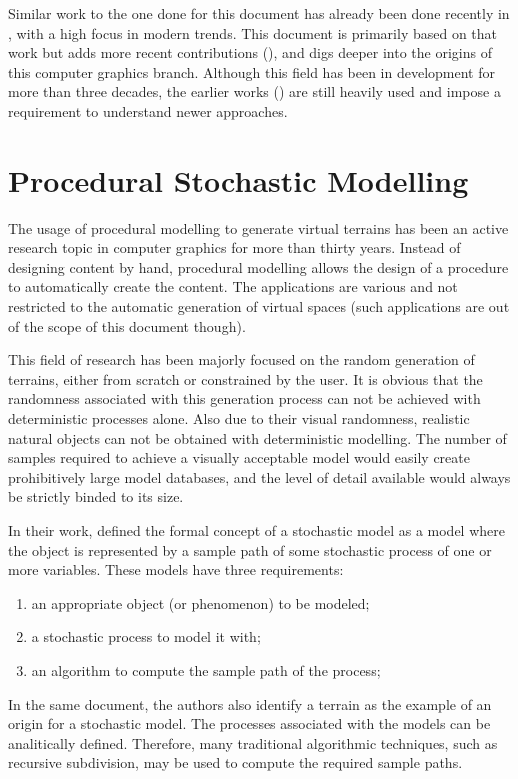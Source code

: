 \documentclass{acmtog}
\begin{document}
Similar work to the one done for this document has already been done recently in \cite{Smelik09}, with a high focus in modern trends. This document is primarily based on that work but adds more recent contributions (\cite{Chen11}), and digs deeper into the origins of this computer graphics branch. Although this field has been in development for more than three decades, the earlier works (\cite{Fournier82,Miller86}) are still heavily used and impose a requirement to understand newer approaches.

\section{Procedural Stochastic Modelling}
The usage of procedural modelling to generate virtual terrains has been an active research topic in computer graphics for more than thirty years. Instead of designing content by hand, procedural modelling allows the design of a procedure to automatically create the content. The applications are various and not restricted to the automatic generation of virtual spaces (such applications are out of the scope of this document though).

This field of research has been majorly focused on the random generation of terrains, either from scratch or constrained by the user. It is obvious that the randomness associated with this generation process can not be achieved with deterministic processes alone. Also due to their visual randomness, realistic natural objects can not be obtained with deterministic modelling. The number of samples required to achieve a visually acceptable model would easily create prohibitively large model databases, and the level of detail available would always be strictly binded to its size.

In their work, \cite{Fournier82} defined the formal concept of a stochastic model as a model where the object is represented by a sample path of some stochastic process of one or more variables. These models have three requirements:
\begin{enumerate}
\item{an appropriate object (or phenomenon) to be modeled;}
\item{a stochastic process to model it with;}
\item{an algorithm to compute the sample path of the process;}
\end{enumerate}
In the same document, the authors also identify a terrain as the example of an origin for a stochastic model. The processes associated with the models can be analitically defined. Therefore, many traditional algorithmic techniques, such as recursive subdivision, may be used to compute the required sample paths.
\end{document}
